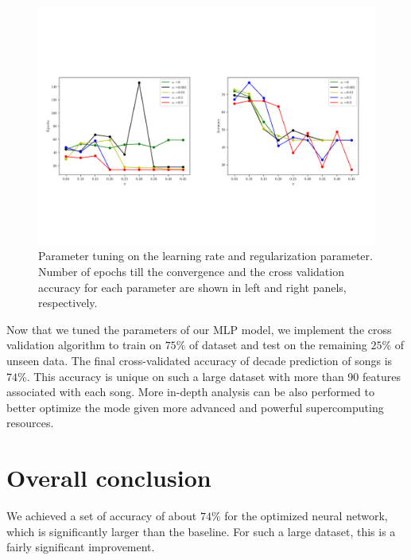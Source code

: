 \documentclass{article}
\begin{document}
\begin{figure}[h!]%
	\centering
	\includegraphics[width=\textwidth]{figs/params.pdf}
	\caption{\footnotesize Parameter tuning on the learning rate and regularization parameter. Number of epochs till the convergence and the cross validation accuracy for each parameter are shown in left and right panels, respectively. }
	\label{fig:fig2}
\end{figure}

\noindent  Now that we tuned the parameters of our MLP model, we implement the cross validation algorithm to train on $75\%$ of dataset and test on the remaining $25\%$ of unseen data. The final cross-validated accuracy of  decade prediction of songs is $74\%$. This accuracy is unique on such a large dataset with more than 90 features associated with each song. More in-depth analysis can be also performed to better optimize the mode given more advanced and powerful supercomputing resources. 

\section*{Overall conclusion}

We achieved a set of accuracy of about $74\%$ for the optimized neural network, which is significantly larger than the baseline. For such a large dataset, this is a fairly significant improvement. 


% 
\end{document}
